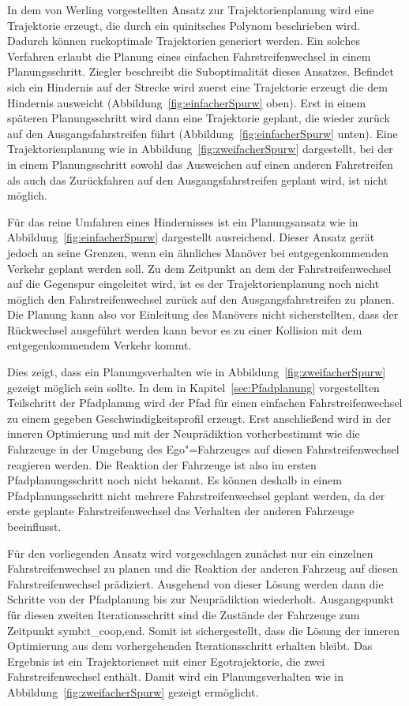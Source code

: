 In dem von Werling \cite{Werling2011} vorgestellten Ansatz zur Trajektorienplanung wird eine Trajektorie erzeugt, die durch ein quinitsches Polynom beschrieben wird.
Dadurch k\"onnen ruckoptimale Trajektorien generiert werden.
Ein solches Verfahren erlaubt die Planung eines einfachen Fahrstreifenwechsel in einem Planungsschritt.
Ziegler \cite{Ziegler2017} beschreibt die Suboptimalit\"at dieses Ansatzes.
Befindet sich ein Hindernis auf der Strecke wird zuerst eine Trajektorie erzeugt die dem Hindernis ausweicht (Abbildung~\ref{fig:einfacherSpurw} oben).
Erst in einem sp\"ateren Planungsschritt wird dann eine Trajektorie geplant, die wieder zur\"uck auf den Ausgangsfahrstreifen f\"uhrt (Abbildung~\ref{fig:einfacherSpurw} unten).
Eine Trajektorienplanung wie in Abbildung~\ref{fig:zweifacherSpurw} dargestellt, bei der in einem Planungsschritt sowohl das Ausweichen auf einen anderen Fahrstreifen als auch das Zur\"uckfahren auf den Ausgangsfahrstreifen geplant wird, ist nicht m\"oglich.

F\"ur das reine Umfahren eines Hindernisses ist ein Planungsansatz wie in Abbildung~\ref{fig:einfacherSpurw} dargestellt ausreichend.
Dieser Ansatz ger\"at jedoch an seine Grenzen, wenn ein \"ahnliches Man\"over bei entgegenkommenden Verkehr geplant werden soll.
Zu dem Zeitpunkt an dem der Fahrstreifenwechsel auf die Gegenspur eingeleitet wird, ist es der Trajektorienplanung noch nicht m\"oglich den Fahrstreifenwechsel zur\"uck auf den Ausgangsfahrstreifen zu planen.
Die Planung kann also vor Einleitung des Man\"overs nicht sicherstellten, dass der R\"uckwechsel ausgef\"uhrt werden kann bevor es zu einer Kollision mit dem entgegenkommendem Verkehr kommt.

Dies zeigt, dass ein Planungsverhalten wie in Abbildung~\ref{fig:zweifacherSpurw} gezeigt m\"oglich sein sollte.
In dem in Kapitel~\ref{sec:Pfadplanung} vorgestellten Teilschritt der Pfadplanung wird der Pfad f\"ur einen einfachen Fahrstreifenwechsel zu einem gegeben Geschwindigkeitsprofil erzeugt.
Erst anschlie{\ss}end wird in der inneren Optimierung und mit der Neupr\"adiktion vorherbestimmt wie die Fahrzeuge in der Umgebung des Ego"=Fahrzeuges auf diesen Fahrstreifenwechsel reagieren werden.
Die Reaktion der Fahrzeuge ist also im ersten Pfadplanungsschritt noch nicht bekannt.
Es k\"onnen deshalb in einem Pfadplanungsschritt nicht mehrere Fahrstreifenwechsel geplant werden, da der erste geplante Fahrstreifenwechsel das Verhalten der anderen Fahrzeuge beeinflusst.

F\"ur den vorliegenden Ansatz wird vorgeschlagen zun\"achst nur ein einzelnen Fahrstreifenwechsel zu planen und die Reaktion der anderen Fahrzeug auf diesen Fahrstreifenwechsel pr\"adiziert.
Ausgehend von dieser L\"osung werden dann die Schritte von der Pfadplanung bis zur Neupr\"adiktion wiederholt.
Ausgangspunkt f\"ur diesen zweiten Iterationsschritt sind die Zust\"ande der Fahrzeuge zum Zeitpunkt \gls{symb:t_coop,end}. 
Somit ist sichergestellt, dass die L\"osung der inneren Optimierung aus dem vorhergehenden Iterationsschritt erhalten bleibt.
Das Ergebnis ist ein Trajektorienset mit einer Egotrajektorie, die zwei Fahrstreifenwechsel enth\"alt.
Damit wird ein Planungsverhalten wie in Abbildung~\ref{fig:zweifacherSpurw} gezeigt erm\"oglicht.

